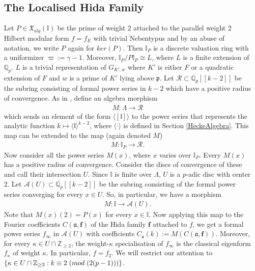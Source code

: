 \documentclass[reqno,10pt]{amsart}
\newcommand{\qp}{\mathbb{Q}_{p}}
\newcommand{\z}{\mathbb{Z}}
\newcommand{\I}{\mathbb{I}}
\newcommand{\f}{\mathbf{f}}
\newcommand{\p}{\mathfrak{p}}
\newcommand{\ip}{\I_P}
\newcommand{\vp}{\varpi}
\theoremstyle{plain}
\theoremstyle{definition}
\begin{document}
\subsection{The Localised Hida Family}
Let $P \in \mathfrak{X}_{alg}(\I)$ be the prime of weight 2 attached to the parallel weight 2 Hilbert modular form $f=f_E$ with trivial Nebentypus and by an abuse of notation, we write $P$ again for $ker(P)$. Then $\ip$ is a discrete valuation ring with a uniformizer $\vp := \gamma - 1$. Moreover, $\ip/P\ip \cong L$, where $L$ is a finite extension of $\qp$. $L$ is a trivial representation of $G_{K',w}$ where $K'$ is either $F$ or a quadratic extension of $F$ and $w$ is a prime of $K'$ lying above $\p$. Let $\mathcal{R} \subset \overline{\qp}[[k-2]]$ be the subring consisting of formal power series in $k-2$ which have a positive radius of convergence. As in \cite[Section 8.1]{MokExceptionalZero}, define an algebra morphism
\begin{align*}
    M : \Lambda \rightarrow \mathcal{R}
\end{align*}
which sends an element of the form $\langle[\mathfrak{l}]\rangle$ to the power series that represents the analytic function $k \mapsto \langle\mathfrak{l}\rangle^{k-2}$, where $\langle \cdot \rangle$ is defined in Section \ref{HeckeAlgebra}. This map can be extended to the map (again denoted $M$)
\begin{align*}
    M : \ip \rightarrow \mathcal{R}.
\end{align*}
Now consider all the power series $M(x)$, where $x$ varies over $\ip$. Every $M(x)$ has a positive radius of convergence. Consider the discs of convergence of these and call their intersection $U$. Since $\I$ is finite over $\Lambda$, $U$ is a $p$-adic disc with center 2. Let $\mathcal{A}(U) \subset \overline{\qp}[[k-2]]$ be the subring consisting of the formal power series converging for every $x \in U$. So, in particular, we have a morphism
\begin{align} \label{def of M}
    M : \I \rightarrow \mathcal{A}(U).
\end{align}
Note that $M(x)(2) = P(x)$ for every $x \in \I$. Now applying this map to the Fourier coefficients $C(\mathfrak{a},\f)$ of the Hida family $\f$ attached to $f$, we get a formal power series $f_\infty$ in $\mathcal{A}(U)$ with coefficients $C_\mathfrak{a}(k) := M(C(\mathfrak{a},\f))$. Moreover, for every $\kappa \in U \cap \z_{\geq 2}$, the weight-$\kappa$ specialisation of $f_\infty$ is the classical eigenform $f_\kappa$ of weight $\kappa$. In particular, $f = f_2$. We will restrict our attention to $\{\kappa \in U \cap \z_{\geq 2} : k \equiv 2 \hspace{1mm} (mod \hspace{1mm} (2(p-1)))\}$.
\end{document}
